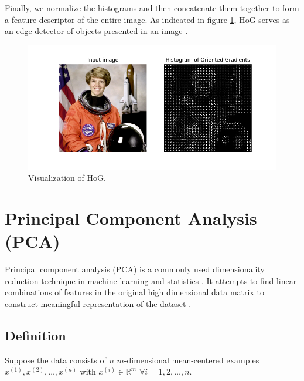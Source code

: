 \noindent Finally, we normalize the histograms and then concatenate them together to form a feature descriptor of the entire image. As indicated in figure \ref{visualization of HoG}, HoG serves as an edge detector of objects presented in an image \cite{7025824}.

\begin{figure}[h]
\captionsetup{justification=centering}
    \centering
    \includegraphics[scale=0.6]{images/hog_vis.png}
    \caption{Visualization of HoG.}
    \label{visualization of HoG}
\end{figure}


\section{Principal Component Analysis (PCA)}

Principal component analysis (PCA) is a commonly used dimensionality reduction technique in machine learning and statistics \cite{pca_reduction}. It attempts to find linear combinations of features in the original high dimensional data matrix to construct meaningful representation of the dataset \cite{doi:10.1080/14786440109462720}. 


\subsection{Definition}

\noindent 
Suppose the data consists of $n$ $m$-dimensional mean-centered examples $x^{(1)}, x^{(2)}, \ldots, x^{(n)}$ with $x^{(i)} \in \mathbb{R}^{m}$ $\forall i = 1,2, \ldots, n$. \\

